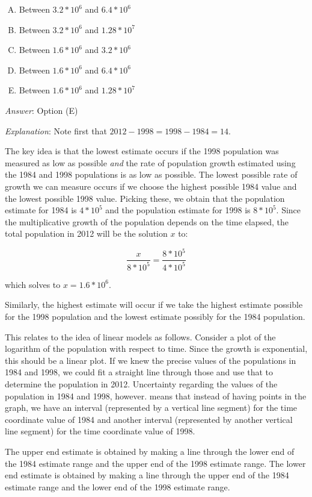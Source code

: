 \documentclass[10pt]{amsart}
\begin{document}
\begin{enumerate}
  \begin{enumerate}[(A)]
  \item Between $3.2 * 10^6$ and $6.4 * 10^6$
  \item Between $3.2 * 10^6$ and $1.28 * 10^7$
  \item Between $1.6 * 10^6$ and $3.2 * 10^6$
  \item Between $1.6 * 10^6$ and $6.4 * 10^6$
  \item Between $1.6 * 10^6$ and $1.28 * 10^7$
  \end{enumerate}

 {\em Answer}: Option (E)

  {\em Explanation}: Note first that $2012 - 1998 = 1998 - 1984 = 14$.

  The key idea is that the lowest estimate occurs
  if the 1998 population was measured as low as possible {\em and} the
  rate of population growth estimated using the 1984 and 1998
  populations is as low as possible. The lowest possible rate of
  growth we can measure occurs if we choose the highest possible 1984
  value and the lowest possible 1998 value. Picking these, we obtain
  that the population estimate for 1984 is $4 * 10^5$ and the
  population estimate for 1998 is $8 * 10^5$. Since the
  multiplicative growth of the population depends on the time elapsed,
  the total population in 2012 will be the solution $x$ to:

  $$\frac{x}{8 * 10^5} = \frac{8 * 10^5}{4 * 10^5}$$

  which solves to $x = 1.6 * 10^6$.

  Similarly, the highest estimate will occur if we take the highest
  estimate possible for the 1998 population and the lowest estimate
  possibly for the 1984 population.

  This relates to the idea of linear models as follows. Consider a
  plot of the logarithm of the population with respect to time. Since
  the growth is exponential, this should be a linear plot. If we knew
  the precise values of the populations in 1984 and 1998, we could fit
  a straight line through those and use that to determine the
  population in 2012. Uncertainty regarding the values of the
  population in 1984 and 1998, however. means that instead of having
  points in the graph, we have an interval (represented by a vertical
  line segment) for the time coordinate value of 1984 and another
  interval (represented by another vertical line segment) for the time
  coordinate value of 1998.

  The upper end estimate is obtained by making a line through the
  lower end of the 1984 estimate range and the upper end of the 1998
  estimate range. The lower end estimate is obtained by making a line
  through the upper end of the 1984 estimate range and the lower end
  of the 1998 estimate range.


\end{enumerate}
\end{document}

